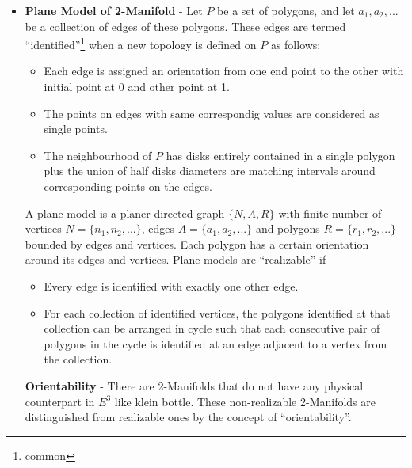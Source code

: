 \documentclass[12pt,a4paper,openbib]{article}
\begin{document}
\begin{itemize}
	\item {\bf Plane Model of 2-Manifold} - Let $P$ be a set of polygons, 
		and let $a_{1}, a_{2},...$ be a collection of edges of these polygons.  		These edges
		are termed ``identified''\footnote{common} when a new topology is
		defined on $P$ as follows:
		\begin{itemize}
			\item Each edge is assigned an orientation from one end point to the
				other with initial point at 0 and other point at 1.
			\item  The points on edges with same correspondig values are 
				considered as single points.
			\item The neighbourhood of $P$ has disks entirely contained in a
				single polygon plus the union of half disks diameters are 
				matching intervals around corresponding points on the edges.
		\end{itemize}
		A plane model is a planer directed graph $\{ N,A,R\}$ with finite 
		number of vertices $N = \{n_{1},n_{2},...\}$, edges $A = \{a_{1},a_{2},
		...\}$ and polygons $R= \{r_{1},r_{2},...\}$ bounded by edges and
		vertices. Each polygon has a certain orientation around its edges and
		vertices. Plane models are ``realizable'' if

		\begin{itemize}
			\item Every edge is identified with exactly one other edge.
			\item For each collection of identified vertices, the polygons
				identified at that collection can be arranged in cycle such 
				that each consecutive pair of polygons in the cycle is 
				identified at an edge adjacent to a vertex from the collection.
		\end{itemize}
		{\bf Orientability} - There are 2-Manifolds that do not have any
		physical counterpart in $E^{3}$ like klein bottle. These non-realizable
		2-Manifolds are distinguished from realizable ones by the concept
		of ``orientability''.


\end{itemize}
\end{document}
